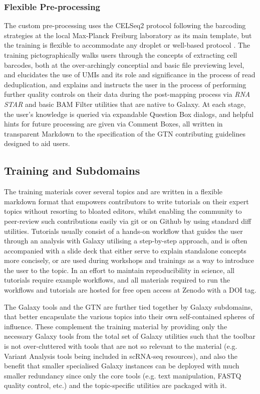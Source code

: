 \documentclass[a4paper,num-refs]{oup-contemporary}
\newcommand{\prog}[1]{\textit{#1}}
\begin{document}
\subsubsection{Flexible Pre-processing}

The custom pre-processing uses the CELSeq2 protocol following the barcoding strategies at the local Max-Planck Freiburg laboratory as its main template, but the training is flexible to accommodate any droplet or well-based protocol \citep{hashimshony2016cel}. The training pictographically walks users through the concepts of extracting cell barcodes, both at the over-archingly conceptial and basic file previewing level, and elucidates the use of UMIs and its role and significance in the process of read deduplication, and explains and instructs the user in the process of performing further quality controls on their data during the post-mapping process via \prog{RNA STAR} and basic BAM Filter utilities that are native to Galaxy. At each stage, the user's knowledge is queried via expandable Question Box dialogs, and helpful hints for future processing are given via Comment Boxes, all written in transparent Markdown to the specification of the GTN contributing guidelines designed to aid users.



\subsection{Training and Subdomains}
The training materials cover several topics and are written in a flexible markdown format that empowers contributors to write tutorials on their expert topics without resorting to bloated editors, whilst enabling the community to peer-review such contributions easily via git or on Github by using standard diff utilities. Tutorials usually consist of a hands-on workflow that guides the user through an analysis with Galaxy utilising a step-by-step approach, and is often accompanied with a slide deck that either serve to explain standalone concepts more concisely, or are used during workshops and trainings as a way to introduce the user to the topic. In an effort to maintain reproducibility in science,  all tutorials require example workflows, and all materials required to run the workflows and tutorials are hosted for free open access at Zenodo with a DOI tag.

The Galaxy tools and the GTN are further tied together by Galaxy subdomains, that better encapsulate the various topics into their own self-contained spheres of influence. These complement the training material by providing only the necessary Galaxy tools from the total set of Galaxy utilities such that the toolbar is not over-cluttered with tools that are not so relevant to the material (e.g. Variant Analysis tools being included in scRNA-seq resources), and also the benefit that smaller specialised Galaxy instances can be deployed with much smaller redundancy since only the core tools (e.g. text manipulation, FASTQ quality control, etc.) and the topic-specific utilities are packaged with it.
\end{document}
